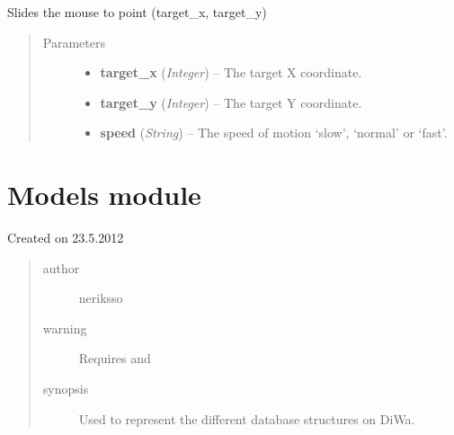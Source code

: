 \documentclass[letterpaper,10pt,english]{sphinxmanual}
\begin{document}

\begin{fulllineitems}
\label{macro:macro.slide_to}
Slides the mouse to point (target\_x, target\_y)
\begin{quote}\begin{description}
\item[{Parameters}] \leavevmode\begin{itemize}
\item {} 
\textbf{target\_x} (\emph{Integer}) -- The target X coordinate.

\item {} 
\textbf{target\_y} (\emph{Integer}) -- The target Y coordinate.

\item {} 
\textbf{speed} (\emph{String}) -- The speed of motion `slow', `normal' or `fast'.

\end{itemize}

\end{description}\end{quote}

\end{fulllineitems}



\section{Models module}
\label{models:module-models}\label{models::doc}\label{models:models-module}
Created on 23.5.2012
\begin{quote}\begin{description}
\item[{author}] \leavevmode
neriksso

\item[{warning}] \leavevmode
Requires  and 

\item[{synopsis}] \leavevmode
Used to represent the different database structures on DiWa.

\end{description}\end{quote}
\end{document}
